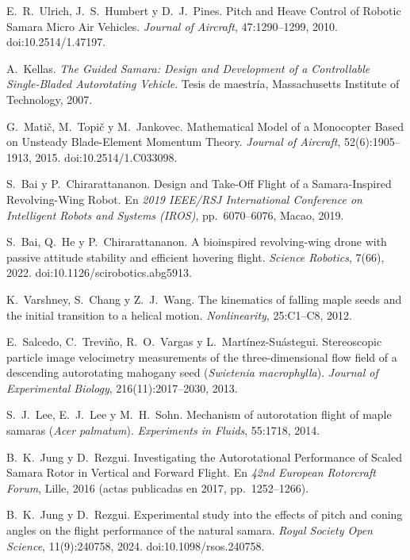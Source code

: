  E.~R.~Ulrich, J.~S.~Humbert y D.~J.~Pines. Pitch and
  Heave Control of Robotic Samara Micro Air Vehicles. \emph{Journal of Aircraft},
  47:1290--1299, 2010. doi:10.2514/1.47197.

 A.~Kellas. \emph{The Guided Samara: Design and Development
  of a Controllable Single-Bladed Autorotating Vehicle}. Tesis de maestría, Massachusetts
  Institute of Technology, 2007.

 G.~Matič, M.~Topič y M.~Jankovec. Mathematical Model of a
  Monocopter Based on Unsteady Blade-Element Momentum Theory. \emph{Journal of Aircraft},
  52(6):1905--1913, 2015. doi:10.2514/1.C033098.

 S.~Bai y P.~Chirarattananon. Design and Take-Off Flight of a
  Samara-Inspired Revolving-Wing Robot. En \emph{2019 IEEE/RSJ International Conference on
  Intelligent Robots and Systems (IROS)}, pp.~6070--6076, Macao, 2019.

 S.~Bai, Q.~He y P.~Chirarattananon. A bioinspired
  revolving-wing drone with passive attitude stability and efficient hovering flight.
  \emph{Science Robotics}, 7(66), 2022. doi:10.1126/scirobotics.abg5913.

 K.~Varshney, S.~Chang y Z.~J.~Wang. The kinematics of
  falling maple seeds and the initial transition to a helical motion.
  \emph{Nonlinearity}, 25:C1--C8, 2012.

 E.~Salcedo, C.~Treviño, R.~O.~Vargas y
  L.~Martínez-Suástegui. Stereoscopic particle image velocimetry measurements of the
  three-dimensional flow field of a descending autorotating mahogany seed (\emph{Swietenia
  macrophylla}). \emph{Journal of Experimental Biology}, 216(11):2017--2030, 2013.

 S.~J.~Lee, E.~J.~Lee y M.~H.~Sohn. Mechanism of autorotation
  flight of maple samaras (\emph{Acer palmatum}). \emph{Experiments in Fluids}, 55:1718,
  2014.

 B.~K.~Jung y D.~Rezgui. Investigating the Autorotational
  Performance of Scaled Samara Rotor in Vertical and Forward Flight. En \emph{42nd European
  Rotorcraft Forum}, Lille, 2016 (actas publicadas en 2017, pp.~1252--1266).

 B.~K.~Jung y D.~Rezgui. Experimental study into the effects
  of pitch and coning angles on the flight performance of the natural samara. \emph{Royal
  Society Open Science}, 11(9):240758, 2024. doi:10.1098/rsos.240758.

